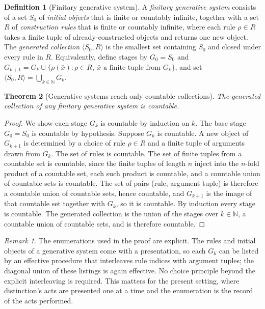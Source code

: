 \documentclass[11pt,a4paper]{article}
\newtheorem{theorem}{Theorem}[section]
\theoremstyle{definition}
\newtheorem{definition}[theorem]{Definition}
\theoremstyle{remark}
\newtheorem*{remark}{Remark}
\begin{document}
\begin{definition}[Finitary generative system]\label{def:gensys}
A \emph{finitary generative system} consists of a set $S_0$ of \emph{initial
objects} that is finite or countably infinite, together with a set $R$ of
\emph{construction rules} that is finite or countably infinite, where each rule
$\rho \in R$ takes a finite tuple of already-constructed objects and returns one
new object. The \emph{generated collection} $\langle S_0, R\rangle$ is the
smallest set containing $S_0$ and closed under every rule in $R$. Equivalently,
define stages by $G_0 = S_0$ and $G_{k+1} = G_k \cup \{\rho(\bar x) : \rho \in R,\ \bar x \text{ a finite tuple from } G_k\}$,
and set $\langle S_0, R\rangle = \bigcup_{k \in \mathbb N} G_k$.
\end{definition}

\begin{theorem}[Generative systems reach only countable collections]\label{thm:countgen}
The generated collection of any finitary generative system is countable.
\end{theorem}

\begin{proof}
We show each stage $G_k$ is countable by induction on $k$. The base stage
$G_0 = S_0$ is countable by hypothesis. Suppose $G_k$ is countable. A new object
of $G_{k+1}$ is determined by a choice of rule $\rho \in R$ and a finite tuple of
arguments drawn from $G_k$. The set of rules is countable. The set of finite
tuples from a countable set is countable, since the finite tuples of length $n$
inject into the $n$-fold product of a countable set, each such product is
countable, and a countable union of countable sets is countable. The set of
pairs (rule, argument tuple) is therefore a countable union of countable sets,
hence countable, and $G_{k+1}$ is the image of that countable set together with
$G_k$, so it is countable. By induction every stage is countable. The generated
collection is the union of the stages over $k \in \mathbb N$, a countable union
of countable sets, and is therefore countable.
\end{proof}

\begin{remark}
The enumerations used in the proof are explicit. The rules and initial objects
of a generative system come with a presentation, so each $G_k$ can be listed by
an effective procedure that interleaves rule indices with argument tuples; the
diagonal union of these listings is again effective. No choice principle beyond
the explicit interleaving is required. This matters for the present setting,
where distinction's acts are presented one at a time and the enumeration is the
record of the acts performed.
\end{remark}
\end{document}
